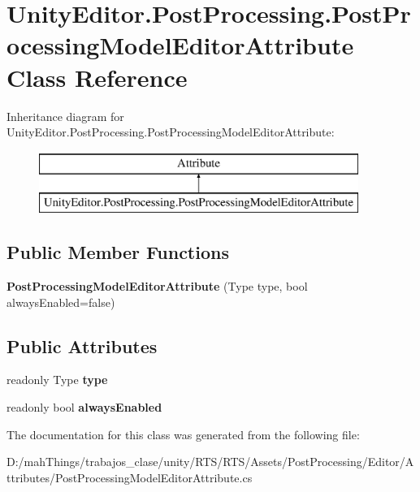\hypertarget{class_unity_editor_1_1_post_processing_1_1_post_processing_model_editor_attribute}{}\section{Unity\+Editor.\+Post\+Processing.\+Post\+Processing\+Model\+Editor\+Attribute Class Reference}
\label{class_unity_editor_1_1_post_processing_1_1_post_processing_model_editor_attribute}
Inheritance diagram for Unity\+Editor.\+Post\+Processing.\+Post\+Processing\+Model\+Editor\+Attribute\+:\begin{figure}[H]
\begin{center}
\leavevmode
\includegraphics[height=2.000000cm]{class_unity_editor_1_1_post_processing_1_1_post_processing_model_editor_attribute}
\end{center}
\end{figure}
\subsection*{Public Member Functions}
\begin{DoxyCompactItemize}
\item 
\mbox{\label{class_unity_editor_1_1_post_processing_1_1_post_processing_model_editor_attribute_a16868845236576459a018d59a09b3e4a}} 
{\bfseries Post\+Processing\+Model\+Editor\+Attribute} (Type type, bool always\+Enabled=false)
\end{DoxyCompactItemize}
\subsection*{Public Attributes}
\begin{DoxyCompactItemize}
\item 
\mbox{\label{class_unity_editor_1_1_post_processing_1_1_post_processing_model_editor_attribute_aa09b0eb015705ec04ab6161174fbe227}} 
readonly Type {\bfseries type}
\item 
\mbox{\label{class_unity_editor_1_1_post_processing_1_1_post_processing_model_editor_attribute_a3f037dfd948be211f3d86c91dc28cdfe}} 
readonly bool {\bfseries always\+Enabled}
\end{DoxyCompactItemize}


The documentation for this class was generated from the following file\+:\begin{DoxyCompactItemize}
\item 
D\+:/mah\+Things/trabajos\+\_\+clase/unity/\+R\+T\+S/\+R\+T\+S/\+Assets/\+Post\+Processing/\+Editor/\+Attributes/Post\+Processing\+Model\+Editor\+Attribute.\+cs\end{DoxyCompactItemize}
